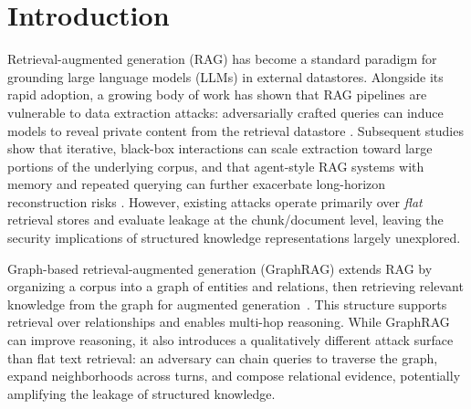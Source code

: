\section{Introduction}



Retrieval-augmented generation (RAG) has become a standard paradigm for grounding large language models (LLMs) in external datastores. Alongside its rapid adoption, a growing body of work has shown that RAG pipelines are vulnerable to data extraction attacks: adversarially crafted queries can induce models to reveal private content from the retrieval datastore \cite{zeng2024good, qifollow}. Subsequent studies show that iterative, black-box interactions can scale extraction toward large portions of the underlying corpus, and that agent-style RAG systems with memory and repeated querying can further exacerbate long-horizon reconstruction risks \cite{cohen2024unleashing, di2024pirates, wang2025unveiling, wang2025silent, jiang2025feedback}.
However, existing attacks operate primarily over \emph{flat} retrieval stores and evaluate leakage at the chunk/document level, leaving the security implications of structured knowledge representations largely unexplored.

Graph-based retrieval-augmented generation (GraphRAG) extends RAG by organizing a corpus into a graph of entities and relations, then retrieving relevant knowledge from the graph for augmented generation~\cite{xiao2025graphrag,zhou2025depth}. 
This structure supports retrieval over relationships and enables multi-hop reasoning. While GraphRAG can improve reasoning, it also introduces a qualitatively different attack surface than flat text retrieval: an adversary can chain queries to traverse the graph, expand neighborhoods across turns, and compose relational evidence, potentially amplifying the leakage of structured knowledge. 

